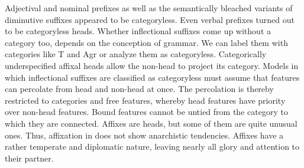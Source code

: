 \documentclass[output=paper
  ,nobabel
  ,draftmode
  ,colorlinks, citecolor=brown
]{langscibook}
\begin{document}
Adjectival and nominal prefixes as well as the semantically bleached variants of diminutive suffixes appeared to be categoryless. Even verbal prefixes turned out to be categoryless heads. Whether inflectional suffixes come up without a category too, depends on the conception of grammar. We can label them with categories like T and Agr or analyze them as categoryless. Categorically underspecified affixal heads allow the non-head to project its category. Models in which inflectional suffixes are classified as categoryless must assume that features can percolate from head and non-head at once. The percolation is thereby restricted to categories and free features, whereby head features have priority over non-head features. Bound features cannot be untied from the category to which they are connected. Affixes are heads, but some of them are quite unusual ones. Thus, affixation in  does not show anarchistic tendencies. Affixes have a rather temperate and diplomatic nature, leaving nearly all glory and attention to their partner.


{\sloppy
\printbibliography[heading=subbibliography,notkeyword=this]
}
\end{document}

